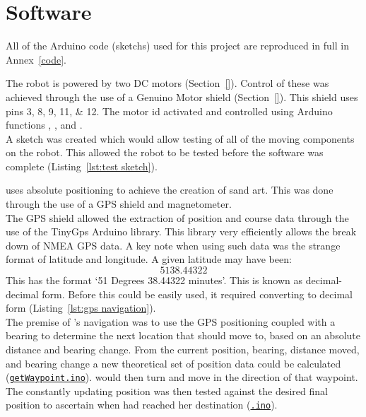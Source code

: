 \chapter{Software}\label{software}\label{section \thechapter}
\noindent All of the \gls{Arduino} code (\glspl{sketch}) used for this project are reproduced in full in Annex~\ref{code}.

    \begin{listing}[bth]
        \caption{Code used to test the moving components of the robot. This sketch was written by \AG. (Lines 82--106 from \hyperref[ino:test_routine]{test\_routine.ino})%
        }%
        \label{lst:test sketch}
    \end{listing}
    The robot is powered by two DC motors (Section~\ref{}). Control of these was achieved through the use of a \gls{Genuino} Motor \Gls{shield} (Section~\ref{}). This shield uses pins \numlist{3;8;9;11;12}. The motor id activated and controlled using Arduino functions , , and .\\
    A \gls{sketch} was created which would allow testing of all of the moving components on the robot. This allowed the robot to be tested before the software was complete (Listing~\ref{lst:test sketch}).

    \begin{listing}[bth]
        \caption{Code used to convert \gls{NMEA} data to decimal form. This sketch was written by \AG. (Lines 81--109 from \hyperref[ino:gps_navigation]{gps\_navigation.ino})%
        }%
        \label{lst:gps navigation}
    \end{listing}
    \SandE uses absolute positioning to achieve the creation of sand art. This was done through the use of a \gls{GPS} \gls{shield} and \gls{magnetometer}.\\
    The \gls{GPS} \gls{shield} allowed the extraction of position and course data through the use of the TinyGps \gls{Arduino library}. This library very efficiently allows the break down of \gls{NMEA} GPS data. A key note when using such data was the strange format of latitude and longitude. A given latitude may have been: $$5138.44322$$ This has the format `51 Degrees 38.44322 minutes'.
    This is known as decimal-decimal form. Before this could be easily used, it required converting to decimal form (Listing~\ref{lst:gps navigation}).\\
    The premise of \SandE's navigation was to use the \gls{GPS} positioning coupled with a bearing to determine the next location that \SandE should move to, based on an absolute distance and bearing change. From the current position, bearing, distance moved, and bearing change a new theoretical set of position data could be calculated (\hyperref[ino:getWaypoint]{\texttt{getWaypoint.ino}}). \SandE would then turn and move in the direction of that waypoint. The constantly updating position was then tested against the desired final position to ascertain when \SandE had reached her destination (\hyperref[ino:]{\texttt{\?.ino}}).

